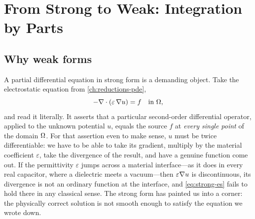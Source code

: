 \chapter{From Strong to Weak: Integration by Parts}
\label{ch:weak}

\providecommand{\vu}{\mathbf{u}}
\providecommand{\vv}{\mathbf{v}}
\providecommand{\vp}{\mathbf{p}}
\providecommand{\vz}{\mathbf{z}}


\section{Why weak forms}

A partial differential equation in strong form is a demanding object. Take the
electrostatic equation from \cref{ch:reductions-pde},
\begin{equation}
  -\nabla\cdot(\varepsilon\,\nabla u) = f \quad\text{in } \Omega,
  \label{eq:strong-es}
\end{equation}
and read it literally. It asserts that a particular second-order differential
operator, applied to the unknown potential $u$, equals the source $f$ at
\emph{every single point} of the domain $\Omega$. For that assertion even to make
sense, $u$ must be twice differentiable: we have to be able to take its
gradient, multiply by the material coefficient $\varepsilon$, take the
divergence of the result, and have a genuine function come out. If the
permittivity $\varepsilon$ jumps across a material interface---as it does in
every real capacitor, where a dielectric meets a vacuum---then $\varepsilon\nabla
u$ is discontinuous, its divergence is not an ordinary function at the
interface, and \cref{eq:strong-es} fails to hold there in any classical sense.
The strong form has painted us into a corner: the physically correct solution
is not smooth enough to satisfy the equation we wrote down.

